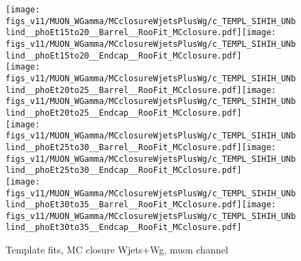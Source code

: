 \begin{figure}[htb]
  \begin{center}
   \texttt{[image: figs\_v11/MUON\_WGamma/MCclosureWjetsPlusWg/c\_TEMPL\_SIHIH\_UNblind\_\_phoEt15to20\_\_Barrel\_\_RooFit\_MCclosure.pdf]}\texttt{[image: figs\_v11/MUON\_WGamma/MCclosureWjetsPlusWg/c\_TEMPL\_SIHIH\_UNblind\_\_phoEt15to20\_\_Endcap\_\_RooFit\_MCclosure.pdf]}\\
   \texttt{[image: figs\_v11/MUON\_WGamma/MCclosureWjetsPlusWg/c\_TEMPL\_SIHIH\_UNblind\_\_phoEt20to25\_\_Barrel\_\_RooFit\_MCclosure.pdf]}\texttt{[image: figs\_v11/MUON\_WGamma/MCclosureWjetsPlusWg/c\_TEMPL\_SIHIH\_UNblind\_\_phoEt20to25\_\_Endcap\_\_RooFit\_MCclosure.pdf]}\\
   \texttt{[image: figs\_v11/MUON\_WGamma/MCclosureWjetsPlusWg/c\_TEMPL\_SIHIH\_UNblind\_\_phoEt25to30\_\_Barrel\_\_RooFit\_MCclosure.pdf]}\texttt{[image: figs\_v11/MUON\_WGamma/MCclosureWjetsPlusWg/c\_TEMPL\_SIHIH\_UNblind\_\_phoEt25to30\_\_Endcap\_\_RooFit\_MCclosure.pdf]}\\
   \texttt{[image: figs\_v11/MUON\_WGamma/MCclosureWjetsPlusWg/c\_TEMPL\_SIHIH\_UNblind\_\_phoEt30to35\_\_Barrel\_\_RooFit\_MCclosure.pdf]}\texttt{[image: figs\_v11/MUON\_WGamma/MCclosureWjetsPlusWg/c\_TEMPL\_SIHIH\_UNblind\_\_phoEt30to35\_\_Endcap\_\_RooFit\_MCclosure.pdf]}\\
  \label{fig:templateFits_MCclosureWjetsPlusWg_SIHIH_MUON_1}
  \caption{Template fits, MC closure Wjets+Wg, muon channel}
  \end{center}
\end{figure}

